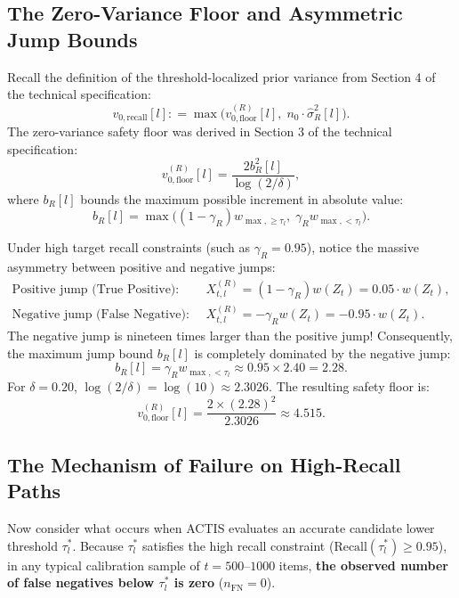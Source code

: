 \documentclass[11pt,a4paper]{article}
\newcommand{\coloneqq}{\mathrel{\mathop:}=}
\begin{document}
\subsection{The Zero-Variance Floor and Asymmetric Jump Bounds}
Recall the definition of the threshold-localized prior variance from Section 4 of the technical specification:
\begin{equation}\label{eq:v0_recall_def}
v_{0, \text{recall}}[l] \coloneqq \max\Big( v_{0, \text{floor}}^{(R)}[l], \; n_0 \cdot \hat{\sigma}_R^2[l] \Big).
\end{equation}
The zero-variance safety floor was derived in Section 3 of the technical specification:
\begin{equation}\label{eq:v0_floor_formula}
v_{0, \text{floor}}^{(R)}[l] = \frac{2 b_R^2[l]}{\log(2/\delta)},
\end{equation}
where $b_R[l]$ bounds the maximum possible increment in absolute value:
\begin{equation}\label{eq:bR_formula}
b_R[l] = \max\Big( (1 - \gamma_R) w_{\max, \ge \tau_l}, \; \gamma_R w_{\max, < \tau_l} \Big).
\end{equation}

Under high target recall constraints (such as $\gamma_R = 0.95$), notice the massive asymmetry between positive and negative jumps:
\begin{align}
\text{Positive jump (True Positive):} \quad & X_{t, l}^{(R)} = (1 - \gamma_R) w(Z_t) = 0.05 \cdot w(Z_t), \\
\text{Negative jump (False Negative):} \quad & X_{t, l}^{(R)} = -\gamma_R w(Z_t) = -0.95 \cdot w(Z_t).
\end{align}
The negative jump is nineteen times larger than the positive jump! Consequently, the maximum jump bound $b_R[l]$ is completely dominated by the negative jump:
\begin{equation}
b_R[l] = \gamma_R w_{\max, < \tau_l} \approx 0.95 \times 2.40 = 2.28.
\end{equation}
For $\delta = 0.20$, $\log(2 / \delta) = \log(10) \approx 2.3026$. The resulting safety floor is:
\begin{equation}
v_{0, \text{floor}}^{(R)}[l] = \frac{2 \times (2.28)^2}{2.3026} \approx 4.515.
\end{equation}

\subsection{The Mechanism of Failure on High-Recall Paths}
Now consider what occurs when ACTIS evaluates an accurate candidate lower threshold $\tau_l^*$. Because $\tau_l^*$ satisfies the high recall constraint ($\text{Recall}(\tau_l^*) \ge 0.95$), in any typical calibration sample of $t = 500\text{--}1000$ items, \textbf{the observed number of false negatives below $\tau_l^*$ is zero} ($n_{\text{FN}} = 0$).
\end{document}
